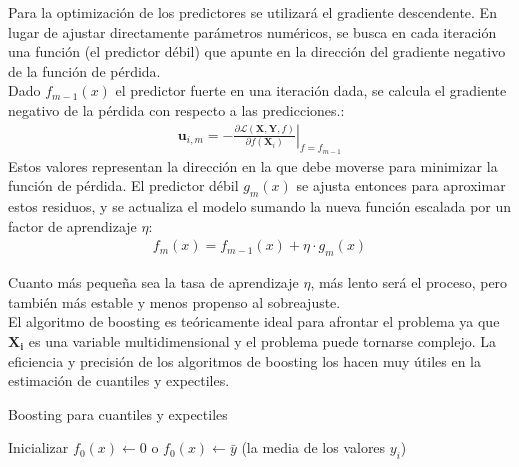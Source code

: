 \documentclass[11pt]{book}
\theoremstyle{plain} %
\theoremstyle{definition} %
\begin{document}
Para la optimización de los predictores se utilizará el gradiente descendente. 
En lugar de ajustar directamente parámetros numéricos, se busca en cada 
iteración una función (el predictor débil) que apunte en la dirección del gradiente negativo de la función de pérdida.\\

Dado $f_{m-1}(x)$ el predictor fuerte en una iteración dada, se calcula el gradiente negativo 
de la pérdida con respecto a las predicciones.:
\begin{align*}
   \mathbf{u}_{i,m} = -\left.\frac{\partial \mathcal{L}(\mathbf{X}, \mathbf{Y}, f)}{\partial f(\mathbf{X}_i)}\right|_{f = f_{m-1}}
\end{align*}
Estos valores representan la dirección en la que debe moverse para minimizar la 
función de pérdida. El predictor débil $g_m(x)$ se ajusta entonces para aproximar 
estos residuos, y se actualiza el modelo sumando la nueva función escalada por un factor de aprendizaje $\eta$:
\begin{align*}
   f_m(x) = f_{m-1}(x) + \eta \cdot g_m(x)
\end{align*}

Cuanto más pequeña sea la tasa de aprendizaje $\eta$, más lento será el proceso, pero 
también más estable y menos propenso al sobreajuste. \\

El algoritmo de boosting es teóricamente ideal para afrontar el problema ya que 
$\mathbf{X_i}$ es una variable multidimensional y el problema puede tornarse complejo. 
La eficiencia y precisión de los algoritmos de boosting los hacen muy útiles en la 
estimación de cuantiles y expectiles.\\





\begin{algorithm}[H]
   \caption{Boosting para cuantiles y expectiles}
   
   Inicializar $f_0(x) \gets 0$ o $f_0(x) \gets \bar{y}$ (la media de los valores $y_i$)\;
   
   \end{algorithm}
   
\end{document}
